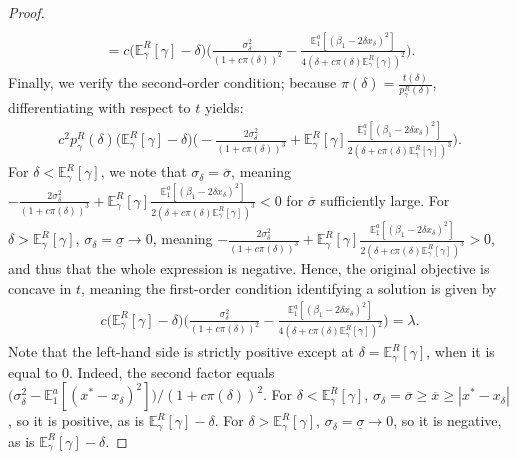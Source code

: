 \documentclass[11pt,dvipsnames]{article}
\begin{document}
\begin{appendix}
\begin{proof}
\begin{align*}
\\
=
c\big(\mathbb{E}_\gamma^R[\gamma]-\delta\big)
\big(\frac{\sigma_\delta^2}{(1+c\pi(\delta))^2}
-\frac{\mathbb{E}_1^a[(\beta_1-2\delta x_\delta)^2]}{4(\delta + c\pi(\delta)\mathbb{E}_\gamma^R[\gamma])^2}\big).
\end{align*}
Finally, we verify the second-order condition; because $\pi(\delta) = \frac{t(\delta)}{p_\gamma^R(\delta)}$, differentiating with respect to $t$ yields:
\begin{align*}
c^2p_\gamma^R(\delta)\big(\mathbb{E}_\gamma^R[\gamma]-\delta\big)
\big(-\frac{2\sigma_\delta^2}{(1+c\pi(\delta))^3}
+\mathbb{E}_\gamma^R[\gamma]\frac{\mathbb{E}_1^a[(\beta_1-2\delta x_\delta)^2]}{2(\delta + c\pi(\delta)\mathbb{E}_\gamma^R[\gamma])^3}\big)	.
\end{align*}
For $\delta < \mathbb{E}_\gamma^R[\gamma]$, we note that $\sigma_\delta = \overline{\sigma}$, meaning $-\frac{2\sigma_\delta^2}{(1+c\pi(\delta))^3}
+\mathbb{E}_\gamma^R[\gamma]\frac{\mathbb{E}_1^a[(\beta_1-2\delta x_\delta)^2]}{2(\delta + c\pi(\delta)\mathbb{E}_\gamma^R[\gamma])^3}<0$ for $\overline{\sigma}$ sufficiently large.
For $\delta> \mathbb{E}_\gamma^R[\gamma]$, $\sigma_\delta = \underline{\sigma}\to0$, meaning $-\frac{2\sigma_\delta^2}{(1+c\pi(\delta))^3}
+\mathbb{E}_\gamma^R[\gamma]\frac{\mathbb{E}_1^a[(\beta_1-2\delta x_\delta)^2]}{2(\delta + c\pi(\delta)\mathbb{E}_\gamma^R[\gamma])^3}>0$, and thus that the whole expression is negative.
Hence, the original objective is concave in $t$, meaning the first-order condition identifying a solution is given by
\begin{align*}
c\big(\mathbb{E}_\gamma^R[\gamma]-\delta\big)
\big(\frac{\sigma_\delta^2}{(1+c\pi(\delta))^2}
-\frac{\mathbb{E}_1^a[(\beta_1-2\delta x_\delta)^2]}{4(\delta + c\pi(\delta)\mathbb{E}_\gamma^R[\gamma])^2}\big) = \lambda.	
\end{align*}
Note that the left-hand side is strictly positive except at $\delta=\mathbb{E}_\gamma^R[\gamma]$, when it is equal to $0$.
Indeed, the second factor equals $\big(\sigma_\delta^2-\mathbb{E}_1^a[(x^*-x_\delta)^2]\big)/(1+c\pi(\delta))^2$. For $\delta<\mathbb{E}_\gamma^R[\gamma]$, $\sigma_\delta=\overline{\sigma}\ge\overline{x}\ge|x^*-x_\delta|$, so it is positive, as is $\mathbb{E}_\gamma^R[\gamma]-\delta$. For $\delta>\mathbb{E}_\gamma^R[\gamma]$, $\sigma_\delta=\underline{\sigma}\to0$, so it is negative, as is $\mathbb{E}_\gamma^R[\gamma]-\delta$.
%

\end{proof}
\end{appendix}
\end{document}
